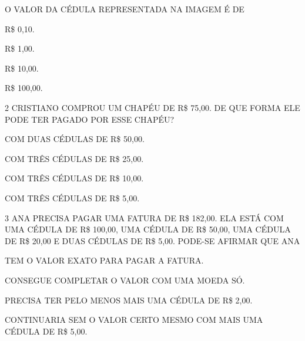 O VALOR DA CÉDULA REPRESENTADA NA IMAGEM É DE


\begin{escolha}
\item R\$ 0,10.

\item R\$ 1,00.

\item R\$ 10,00.

\item R\$ 100,00.
\end{escolha}


\num{2} CRISTIANO COMPROU UM CHAPÉU DE R\$ 75,00. DE QUE FORMA ELE PODE TER PAGADO POR ESSE CHAPÉU?

\begin{escolha}
\item COM DUAS CÉDULAS DE R\$ 50,00.

\item COM TRÊS CÉDULAS DE R\$ 25,00.

\item COM TRÊS CÉDULAS DE R\$ 10,00.

\item COM TRÊS CÉDULAS DE R\$ 5,00.
\end{escolha}




\num{3} ANA PRECISA PAGAR UMA FATURA DE R\$ 182,00. ELA ESTÁ COM UMA CÉDULA DE R\$ 100,00, UMA CÉDULA DE R\$ 50,00, UMA CÉDULA DE R\$ 20,00 E DUAS CÉDULAS DE R\$ 5,00. PODE-SE AFIRMAR QUE ANA

\begin{escolha}
\item TEM O VALOR EXATO PARA PAGAR A FATURA.

\item CONSEGUE COMPLETAR O VALOR COM UMA MOEDA SÓ.

\item PRECISA TER PELO MENOS MAIS UMA CÉDULA DE R\$ 2,00.

\item CONTINUARIA SEM O VALOR CERTO MESMO COM MAIS UMA CÉDULA DE R\$ 5,00.
\end{escolha}

